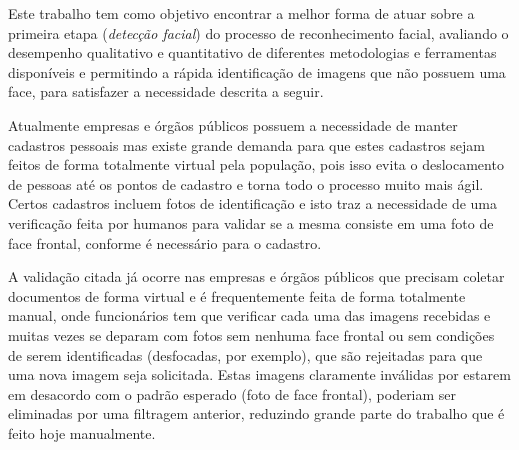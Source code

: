 Este trabalho tem como objetivo encontrar a melhor forma de atuar sobre a primeira etapa (\textit{detecção facial}) do processo de reconhecimento facial, avaliando o desempenho qualitativo e quantitativo de diferentes metodologias e ferramentas disponíveis e permitindo a rápida identificação de imagens que não possuem uma face, para satisfazer a necessidade descrita a seguir.

Atualmente empresas e órgãos públicos possuem a necessidade de manter cadastros pessoais mas existe grande demanda para que estes cadastros sejam feitos de forma totalmente virtual pela população, pois isso evita o deslocamento de pessoas até os pontos de cadastro e torna todo o processo muito mais ágil. Certos cadastros incluem fotos de identificação e isto traz a necessidade de uma verificação feita por humanos para validar se a mesma consiste em uma foto de face frontal, conforme é necessário para o cadastro.

A validação citada já ocorre nas empresas e órgãos públicos que precisam coletar documentos de forma virtual e é frequentemente feita de forma totalmente manual, onde funcionários tem que verificar cada uma das imagens recebidas e muitas vezes se deparam com fotos sem nenhuma face frontal ou sem condições de serem identificadas (desfocadas, por exemplo), que são rejeitadas para que uma nova imagem seja solicitada. Estas imagens claramente inválidas por estarem em desacordo com o padrão esperado (foto de face frontal), poderiam ser eliminadas por uma filtragem anterior, reduzindo grande parte do trabalho que é feito hoje manualmente.

